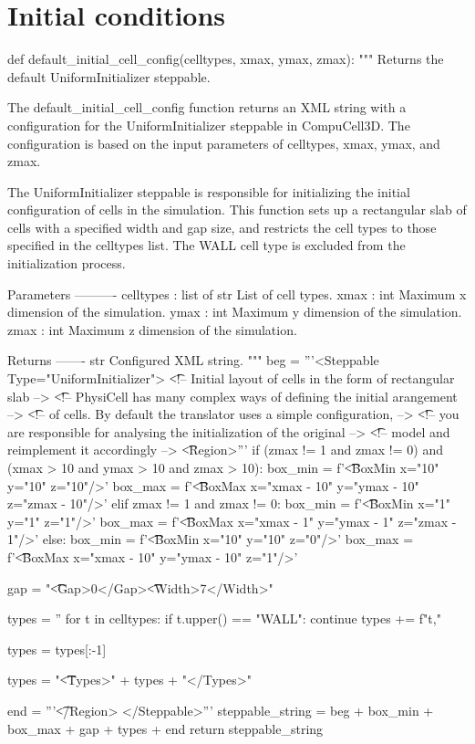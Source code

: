\section{Initial conditions}\label{code:trans:init-cond}

\begin{python}
def default_initial_cell_config(celltypes, xmax, ymax, zmax):
    """
    Returns the default UniformInitializer steppable.

    The default_initial_cell_config function returns an XML string with a configuration for
    the UniformInitializer steppable in CompuCell3D. The configuration is based on the input parameters of celltypes,
    xmax, ymax, and zmax.

    The UniformInitializer steppable is responsible for initializing the initial configuration of cells in the
    simulation. This function sets up a rectangular slab of cells with a specified width and gap size, and restricts
    the cell types to those specified in the celltypes list. The WALL cell type is excluded from the initialization
    process.

    Parameters
    ----------
    celltypes : list of str
        List of cell types.
    xmax : int
        Maximum x dimension of the simulation.
    ymax : int
        Maximum y dimension of the simulation.
    zmax : int
        Maximum z dimension of the simulation.

    Returns
    -------
    str
        Configured XML string.
    """
    beg = '''<Steppable Type="UniformInitializer">
\t<!-- Initial layout of cells in the form of rectangular slab -->
\t<!-- PhysiCell has many complex ways of defining the initial arangement -->
\t<!-- of cells. By default the translator uses a simple configuration, -->
\t<!-- you are responsible for analysing the initialization of the original -->
\t<!-- model and reimplement it accordingly -->
\t<Region>\n'''
    if (zmax != 1 and zmax != 0) and (xmax > 10 and ymax > 10 and zmax > 10):
        box_min = f'\t\t<BoxMin x="{10}" y="{10}" z="{10}"/>\n'
        box_max = f'\t\t<BoxMax x="{xmax - 10}" y="{ymax - 10}" z="{zmax - 10}"/>\n'
    elif zmax != 1 and zmax != 0:
        box_min = f'\t\t<BoxMin x="{1}" y="{1}" z="{1}"/>\n'
        box_max = f'\t\t<BoxMax x="{xmax - 1}" y="{ymax - 1}" z="{zmax - 1}"/>\n'
    else:
        box_min = f'\t\t<BoxMin x="{10}" y="{10}" z="{0}"/>\n'
        box_max = f'\t\t<BoxMax x="{xmax - 10}" y="{ymax - 10}" z="{1}"/>\n'

    gap = "\t\t<Gap>0</Gap>\n\t\t<Width>7</Width>\n"

    types = ''
    for t in celltypes:
        if t.upper() == "WALL":
            continue
        types += f"{t},"

    types = types[:-1]

    types = "\t\t<Types>" + types + "</Types>\n"

    end = '''\t</Region>
</Steppable>'''
    steppable_string = beg + box_min + box_max + gap + types + end
    return steppable_string

\end{python}

